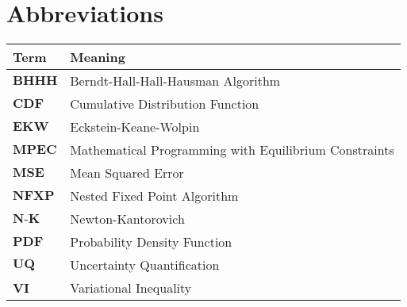 

\section*{Abbreviations} %
\thispagestyle{plain} %

\phantom{This text will be invisible}
\hspace{20cm}



\begin{table}[H]
	\centering
	\renewcommand{\arraystretch}{1.2}%
	\begin{tabular}{@{}ll@{}}
		\toprule\midrule
	Term\phantom{space}	& Meaning \\ \midrule
		$\textbf{BHHH}$	& Berndt-Hall-Hall-Hausman Algorithm \\
		$\textbf{CDF}$  & Cumulative Distribution Function \\
		$\textbf{EKW}$  & Eckstein-Keane-Wolpin \\
		$\textbf{MPEC}$	& Mathematical Programming with Equilibrium Constraints \\
		$\textbf{MSE}$	& Mean Squared Error \\
		$\textbf{NFXP}$	& Nested Fixed Point Algorithm \\
		$\textbf{N-K}$	& Newton-Kantorovich \\
		$\textbf{PDF}$  & Probability Density Function \\
		$\textbf{UQ}$   & Uncertainty Quantification \\
		$\textbf{VI}$	& Variational Inequality \\
 \bottomrule
	\end{tabular}
\end{table}
